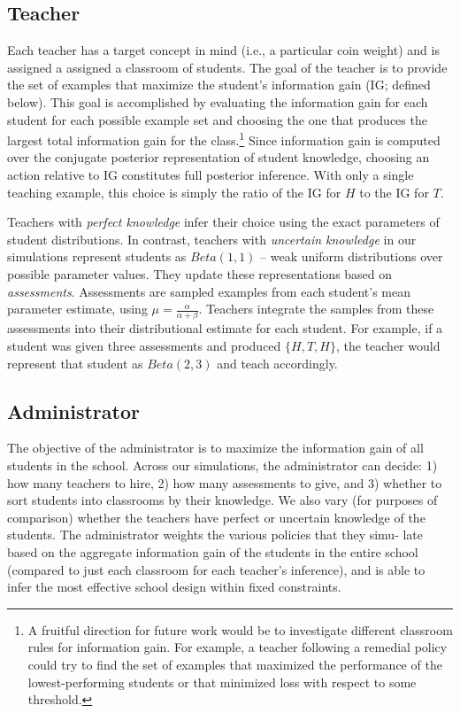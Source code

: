\documentclass[10pt, letterpaper]{article}
\begin{document}
\subsection{Teacher}\label{teacher}

Each teacher has a target concept in mind (i.e., a particular coin
weight) and is assigned a assigned a classroom of students. The goal of
the teacher is to provide the set of examples that maximize the
student's information gain (IG; defined below). This goal is
accomplished by evaluating the information gain for each student for
each possible example set and choosing the one that produces the largest
total information gain for the class.\footnote{A fruitful direction for
  future work would be to investigate different classroom rules for
  information gain. For example, a teacher following a remedial policy
  could try to find the set of examples that maximized the performance
  of the lowest-performing students or that minimized loss with respect
  to some threshold.} Since information gain is computed over the
conjugate posterior representation of student knowledge, choosing an
action relative to IG constitutes full posterior inference. With only a
single teaching example, this choice is simply the ratio of the IG for
\(H\) to the IG for \(T\).

Teachers with \emph{perfect knowledge} infer their choice using the
exact parameters of student distributions. In contrast, teachers with
\emph{uncertain knowledge} in our simulations represent students as
\(Beta(1,1)\) -- weak uniform distributions over possible parameter
values. They update these representations based on \emph{assessments}.
Assessments are sampled examples from each student's mean parameter
estimate, using \(\mu = \frac{\alpha}{\alpha + \beta}\). Teachers
integrate the samples from these assessments into their distributional
estimate for each student. For example, if a student was given three
assessments and produced \(\{H, T, H\}\), the teacher would represent
that student as \(Beta(2,3)\) and teach accordingly.

\subsection{Administrator}\label{administrator}

The objective of the administrator is to maximize the information gain
of all students in the school. Across our simulations, the administrator
can decide: 1) how many teachers to hire, 2) how many assessments to
give, and 3) whether to sort students into classrooms by their
knowledge. We also vary (for purposes of comparison) whether the
teachers have perfect or uncertain knowledge of the students. The
administrator weights the various policies that they simu- late based on
the aggregate information gain of the students in the entire school
(compared to just each classroom for each teacher's inference), and is
able to infer the most effective school design within fixed constraints.
\end{document}
